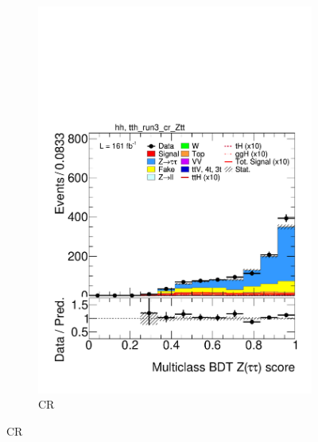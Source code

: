 \begin{figure}[htbp]
  \begin{subfigure}[b]{0.49\textwidth}
    \centering
    \includegraphics[width=\textwidth]{images/plots_modelling_run2_run3_variables/run_3_tth/plot_tth_th_multiclass_Z_hh_tth_run3_cr_Ztt_22_23_24.pdf}
    \caption{\ztautau CR}


\end{subfigure}
\end{figure}
